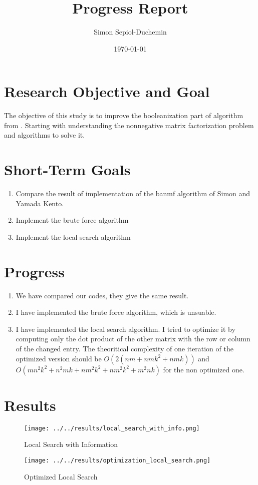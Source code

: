 \documentclass[a4paper,11pt]{article}
\title{Progress Report}
\author{Simon Sepiol-Duchemin}
\date{\today}
\begin{document}
%
\maketitle
\thispagestyle{empty}
%
\section{Research Objective and Goal}
The objective of this study is to improve the booleanization part of algorithm from \cite{9521203}. Starting with understanding the nonnegative matrix factorization problem and algorithms to solve it.
\section{Short-Term Goals}
\begin{enumerate}
\item Compare the result of implementation of the banmf algorithm of Simon and Yamada Kento.
\item Implement the brute force algorithm
\item Implement the local search algorithm 
\end{enumerate}
\section{Progress}
\begin{enumerate}
\item We have compared our codes, they give the same result.
\item I have implemented the brute force algorithm, which is unsuable.
\item I have implemented the local search algorithm.
I tried to optimize it by computing only the dot product of the other matrix with the row or column of the changed entry. The theoritical complexity of one iteration of the optimized version should be $O(2(nm+nmk^2+nmk))$ and $O(mn^2k^2+n^2mk+nm^2k^2+nm^2k^2+m^2nk)$ for the non optimized one.
\end{enumerate}

\section{Results}
    
\begin{figure}[H]
    \centering
    \texttt{[image: ../../results/local\_search\_with\_info.png]}
    \caption{Local Search with Information}
\end{figure}

\begin{figure}[H]
    \centering
    \texttt{[image: ../../results/optimization\_local\_search.png]}
    \caption{Optimized Local Search}
\end{figure}




\end{document}
